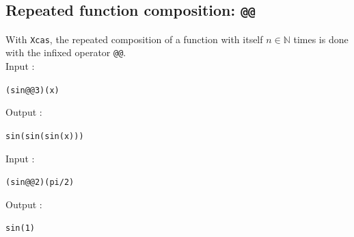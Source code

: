 \documentclass[a4paper,11pt]{book}
\begin{document}
\subsection{Repeated function composition: {\tt @@}}
With {\tt Xcas}, the repeated composition of a function with itself
 $n \in {\mathbb N}$ times is done with the infixed operator {\tt @@}.\\
Input :
\begin{center}{\tt (sin@@3)(x)}\end{center}
Output :
\begin{center}{\tt sin(sin(sin(x)))}\end{center}  
Input :
\begin{center}{\tt (sin@@2)(pi/2)}\end{center}
Output :
\begin{center}{\tt sin(1)}\end{center} 
\end{document}
